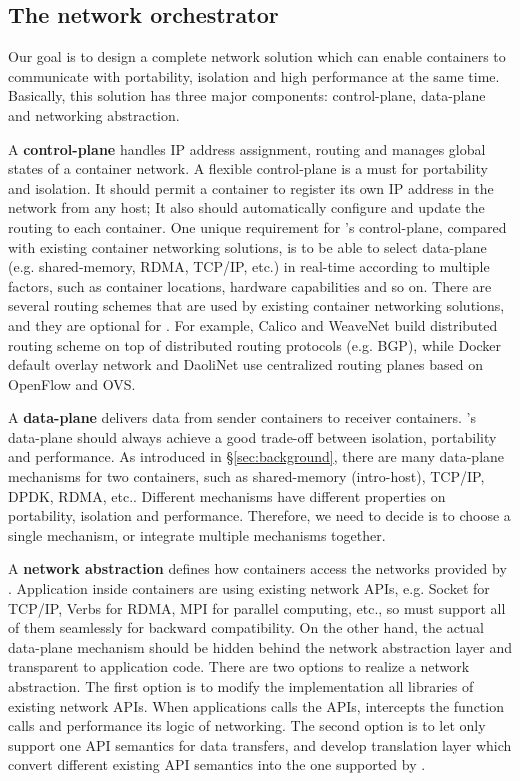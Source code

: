 \subsection{The network orchestrator}

Our goal is to design a complete network solution which can enable containers
to communicate with portability, isolation and high performance at the same time.
Basically, this solution has three major components: control-plane, data-plane 
and networking abstraction. 


A \textbf{control-plane} handles IP address assignment, routing and manages global states of a container network.
A flexible control-plane is a must for portability and isolation. 
It should permit a container to register its own IP address in the network
from any host; It also should automatically configure and update the routing 
to each container. One unique requirement for \sysname's control-plane,
compared with existing container networking solutions, is to be able to 
select data-plane (e.g. shared-memory, RDMA, TCP/IP, etc.) in real-time
according to multiple factors, such as container locations, hardware 
capabilities and so on. 
There are several routing schemes that are used by existing
container networking solutions, and they are optional for \sysname. 
For example, Calico and WeaveNet build distributed routing scheme on top of 
distributed routing protocols (e.g. BGP), while Docker default overlay network
and DaoliNet use centralized routing planes based on OpenFlow and OVS.

A \textbf{data-plane} delivers data from sender containers to receiver 
containers. \sysname's data-plane should always achieve a good trade-off
between isolation, portability and performance. 
As introduced in \S\ref{sec:background}, there are many data-plane mechanisms
for two containers, such as shared-memory (intro-host), TCP/IP, DPDK, RDMA, etc..
Different mechanisms have different properties on portability, isolation and 
performance. Therefore, we need to decide is to choose a single mechanism, or
integrate multiple mechanisms together.

A \textbf{network abstraction} defines how containers access the networks
provided by \sysname. Application inside containers are using existing 
network APIs, e.g. Socket for TCP/IP, Verbs for RDMA, MPI for parallel computing, etc., so \sysname must support all of them seamlessly for 
backward compatibility. On the other hand, the actual data-plane mechanism
should be hidden behind the network abstraction layer and transparent to 
application code. There are two options to realize a network abstraction.
The first option is to modify the implementation all libraries of existing
network APIs. When applications calls the APIs, \sysname intercepts
the function calls and performance its logic of networking. 
The second option is to let \sysname only support one API semantics for
data transfers, and develop translation layer which convert different
existing API semantics into the one supported by \sysname.

